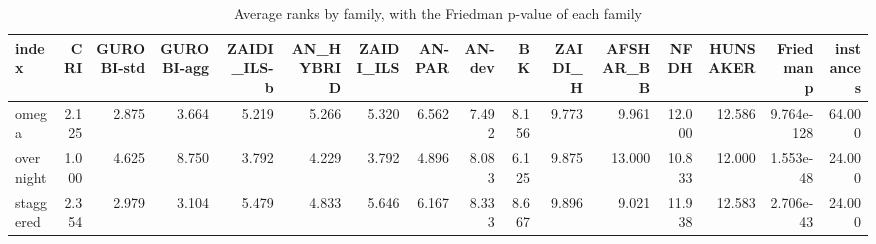 \begin{table}[htbp]
\centering
\small
\caption{Average ranks by family, with the Friedman p-value of each family}
\label{tab:E10a_state_of_the_art_b10_ranks_by_family}
\begin{tabular}{lrrrrrrrrrrrrrrr}
\toprule
index & CRI & GUROBI-std & GUROBI-agg & ZAIDI\_ILS-b & AN\_HYBRID & ZAIDI\_ILS & AN-PAR & AN-dev & BK & ZAIDI\_H & AFSHAR\_BB & NFDH & HUNSAKER & Friedman p & instances \\
\midrule
omega & 2.125 & 2.875 & 3.664 & 5.219 & 5.266 & 5.320 & 6.562 & 7.492 & 8.156 & 9.773 & 9.961 & 12.000 & 12.586 & 9.764e-128 & 64.000 \\
overnight & 1.000 & 4.625 & 8.750 & 3.792 & 4.229 & 3.792 & 4.896 & 8.083 & 6.125 & 9.875 & 13.000 & 10.833 & 12.000 & 1.553e-48 & 24.000 \\
staggered & 2.354 & 2.979 & 3.104 & 5.479 & 4.833 & 5.646 & 6.167 & 8.333 & 8.667 & 9.896 & 9.021 & 11.938 & 12.583 & 2.706e-43 & 24.000 \\
\bottomrule
\end{tabular}
\end{table}
